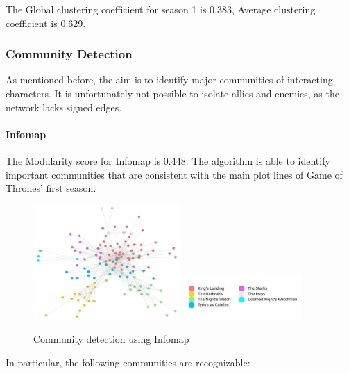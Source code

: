 \documentclass[10pt,twocolumn,letterpaper]{article}
\begin{document}
The Global clustering coefficient for season 1 is 0.383, Average clustering coefficient is 0.629.

\subsubsection{Community Detection}

As mentioned before, the aim is to identify major communities of interacting characters. It is unfortunately not possible to isolate allies and enemies, as the network lacks signed edges.

\paragraph{Infomap} The Modularity score for Infomap is 0.448. The algorithm is able to identify important communities that are consistent with the main plot lines of Game of Thrones' first season. 

\begin{figure}[!h]
    \centering
    \includegraphics[width=0.5\textwidth]{img/s1/communities_infomap.jpg}
    \includegraphics[width=0.4\textwidth]{img/s1/infomap_legend.jpg} \\
    \vspace{0.2cm}
    \label{fig:infomap_s1}
    \caption{\small{Community detection using Infomap}}
\end{figure}

In particular, the following communities are recognizable:
\end{document}

